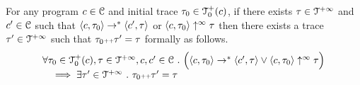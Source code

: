   \begin{lemma}
    For any program $c \in \mathcal{C}$ and initial trace $\mathtt{\tau}_0 \in \mathcal{T}^{+}_0(c)$,
    if there exists $\mathtt{\tau} \in \mathcal{T}^{+\infty}$ and $c' \in \mathcal{C} $ such that $\langle c, \mathtt{\tau}_0 \rangle \rightarrow^{*} \langle c', \mathtt{\tau} \rangle $ or 
    $\langle c, \mathtt{\tau}_0 \rangle \uparrow^{\infty} \mathtt{\tau}$  
    then there exists a trace $\mathtt{\tau}' \in \mathcal{T}^{+\infty}$ such that $\mathtt{\tau}_0 {\scriptscriptstyle ++} \mathtt{\tau}' = \mathtt{\tau}$ formally as follows.
    \[
      \begin{array}{l}
      \forall \mathtt{\tau}_0 \in \mathcal{T}^{+}_0(c), \mathtt{\tau} \in \mathcal{T}^{+\infty}, c, c' \in \mathcal{C} ~.~
      \Big( \langle c, \mathtt{\tau}_0 \rangle \rightarrow^{*} \langle c', \mathtt{\tau} \rangle 
      \lor  \langle c, \mathtt{\tau}_0 \rangle \uparrow^{\infty} \mathtt{\tau} \Big)
      \\ \quad
      \implies \exists \mathtt{\tau}' \in \mathcal{T}^{+\infty} ~.~ \mathtt{\tau}_0 {\scriptscriptstyle ++} \mathtt{\tau}' = \mathtt{\tau} 
      \end{array}
    \]
\end{lemma}
